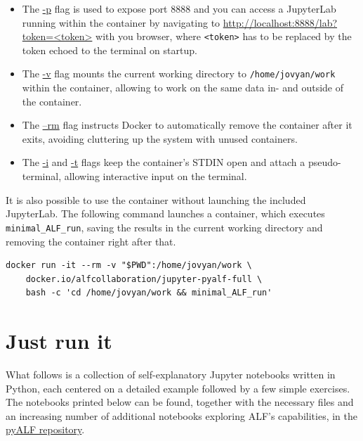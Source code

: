 \documentclass[10pt,modern]{scrartcl}
\numberwithin{exerciseitem}{exercise} %
\begin{document}
\begin{itemize}
   \item The \href{https://docs.docker.com/reference/cli/docker/container/run/#publish}{-p} flag is used to expose port 8888
   and you can access a JupyterLab running within the container by navigating to \url{http://localhost:8888/lab?token=<token>}
   with you browser, where \texttt{<token>} has to be replaced by the token echoed to the terminal on startup.
   \item The \href{https://docs.docker.com/reference/cli/docker/container/run/#volume}{-v} flag mounts the
   current working directory to \texttt{/home/jovyan/work} within the container, allowing to work on
   the same data in- and outside of the container.
   \item The \href{https://docs.docker.com/reference/cli/docker/container/run/#rm}{--rm} flag instructs Docker
   to automatically remove the container after it exits, avoiding cluttering up the system with unused containers.
   \item The \href{https://docs.docker.com/reference/cli/docker/container/run/#interactive}{-i} and
   \href{https://docs.docker.com/reference/cli/docker/container/run/#tty}{-t} flags keep the
   container's STDIN open and attach a pseudo-terminal, allowing interactive input on the terminal.
\end{itemize}
   
It is also possible to use the container without launching the included JupyterLab. The following command
launches a container, which executes \texttt{minimal\_ALF\_run}, saving the results in the current working directory and removing the container right after that.


\begin{lstlisting}[style=bash]
docker run -it --rm -v "$PWD":/home/jovyan/work \
    docker.io/alfcollaboration/jupyter-pyalf-full \
    bash -c 'cd /home/jovyan/work && minimal_ALF_run'
\end{lstlisting}


\part{Just run it}

What follows is a collection of self-explanatory Jupyter notebooks written in Python, each centered on a detailed example followed by a few simple exercises. The notebooks printed below can be found, together with the necessary files and an increasing number of additional notebooks exploring ALF's capabilities, in the \href{https://git.physik.uni-wuerzburg.de/ALF/pyALF}{pyALF repository}.
\end{document}
